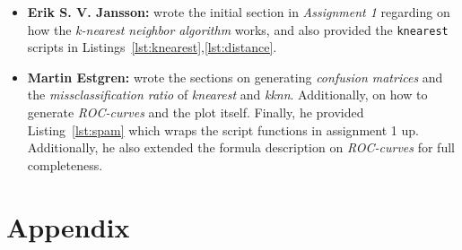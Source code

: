 \documentclass[a4paper, twocolumn]{article}
\begin{document}
    \begin{itemize}
        \item{\textbf{Erik S. V. Jansson:} wrote the initial section in \emph{Assignment 1} regarding on how the \emph{k-nearest neighbor algorithm} works, and also provided the \texttt{knearest} scripts in Listings~\ref{lst:knearest},\ref{lst:distance}.}
        \item{\textbf{Martin Estgren:} wrote the sections on generating \emph{confusion matrices} and the \emph{missclassification ratio} of \emph{knearest} and \emph{kknn}. Additionally, on how to generate \emph{ROC-curves} and the plot itself. Finally, he provided Listing~\ref{lst:spam} which wraps the script functions in assignment 1 up. Additionally, he also extended the formula description on \emph{ROC-curves} for full completeness.}
    \end{itemize}

    \nocite{*} %
    
    
    \onecolumn \appendix
    \section*{Appendix}

    
    
    
\end{document}
